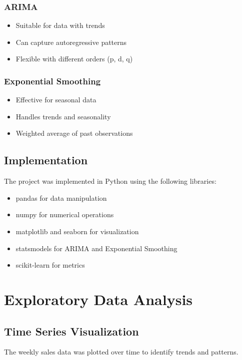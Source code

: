 \documentclass[12pt,a4paper]{report}
\begin{document}
\subsection{ARIMA}
\begin{itemize}
    \item Suitable for data with trends
    \item Can capture autoregressive patterns
    \item Flexible with different orders (p, d, q)
\end{itemize}

\subsection{Exponential Smoothing}
\begin{itemize}
    \item Effective for seasonal data
    \item Handles trends and seasonality
    \item Weighted average of past observations
\end{itemize}

\section{Implementation}
\label{sec:implementation}
The project was implemented in Python using the following libraries:
\begin{itemize}
    \item pandas for data manipulation
    \item numpy for numerical operations
    \item matplotlib and seaborn for visualization
    \item statsmodels for ARIMA and Exponential Smoothing
    \item scikit-learn for metrics
\end{itemize}

\chapter{Exploratory Data Analysis}
\label{ch:eda}

\section{Time Series Visualization}
The weekly sales data was plotted over time to identify trends and patterns.
\end{document}
